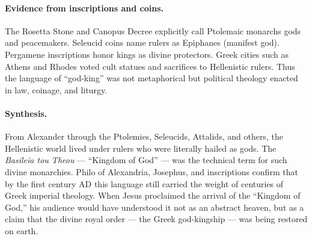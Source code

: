 \paragraph{Evidence from inscriptions and coins.}
The Rosetta Stone and Canopus Decree explicitly call Ptolemaic monarchs gods and peacemakers.
Seleucid coins name rulers as Epiphanes (manifest god).
Pergamene inscriptions honor kings as divine protectors.
Greek cities such as Athens and Rhodes voted cult statues and sacrifices to Hellenistic rulers.
Thus the language of “god-king” was not metaphorical but political theology enacted in law, coinage, and liturgy.

\paragraph{Synthesis.}
From Alexander through the Ptolemies, Seleucids, Attalids, and others, the Hellenistic world lived under rulers who were literally hailed as gods.
The \textit{Basileia tou Theou} — “Kingdom of God” — was the technical term for such divine monarchies.
Philo of Alexandria, Josephus, and inscriptions confirm that by the first century AD this language still carried the weight of centuries of Greek imperial theology.
When Jesus proclaimed the arrival of the “Kingdom of God,” his audience would have understood it not as an abstract heaven, but as a claim that the divine royal order — the Greek god-kingship — was being restored on earth.

